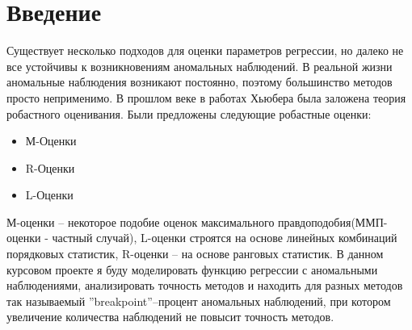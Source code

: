 \documentclass[12pt]{article}
\begin{document}
\section{Введение}
Существует несколько подходов для оценки параметров регрессии, но далеко не все устойчивы к возникновениям аномальных наблюдений.
В реальной жизни аномальные наблюдения возникают постоянно, поэтому большинство методов просто неприменимо.
В прошлом веке в работах Хьюбера была заложена теория робастного оценивания.\hfill\break
Были предложены следующие робастные оценки\cite{Huber}:\hfill\break
\begin{itemize}
    \item М-Оценки\\
    \item R-Оценки\\
    \item L-Оценки
\end{itemize}
М-оценки -- некоторое подобие оценок максимального правдоподобия(ММП-оценки - частный случай), L-оценки строятся на основе линейных комбинаций порядковых статистик, R-оценки -- на основе ранговых статистик.
В данном курсовом проекте я буду моделировать функцию регрессии с аномальными наблюдениями, анализировать точность методов и находить для разных методов так называемый ''breakpoint''--процент аномальных наблюдений, при котором увеличение количества наблюдений не повысит точность методов.
\end{document}
